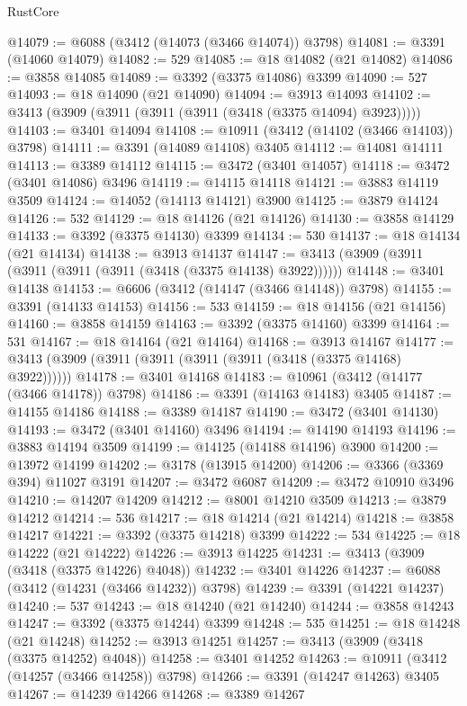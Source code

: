 \begin{lexlean}{RustCore}
\begin{coremodule}
@14079 := @6088 (@3412 (@14073 (@3466 @14074)) @3798)
@14081 := @3391 (@14060 @14079)
@14082 := 529
@14085 := @18 @14082 (@21 @14082)
@14086 := @3858 @14085
@14089 := @3392 (@3375 @14086) @3399
@14090 := 527
@14093 := @18 @14090 (@21 @14090)
@14094 := @3913 @14093
@14102 := @3413 (@3909 (@3911 (@3911 (@3911 (@3418 (@3375 @14094) @3923)))))
@14103 := @3401 @14094
@14108 := @10911 (@3412 (@14102 (@3466 @14103)) @3798)
@14111 := @3391 (@14089 @14108) @3405
@14112 := @14081 @14111
@14113 := @3389 @14112
@14115 := @3472 (@3401 @14057)
@14118 := @3472 (@3401 @14086) @3496
@14119 := @14115 @14118
@14121 := @3883 @14119 @3509
@14124 := @14052 (@14113 @14121) @3900
@14125 := @3879 @14124
@14126 := 532
@14129 := @18 @14126 (@21 @14126)
@14130 := @3858 @14129
@14133 := @3392 (@3375 @14130) @3399
@14134 := 530
@14137 := @18 @14134 (@21 @14134)
@14138 := @3913 @14137
@14147 := @3413 (@3909 (@3911 (@3911 (@3911 (@3911 (@3418 (@3375 @14138) @3922))))))
@14148 := @3401 @14138
@14153 := @6606 (@3412 (@14147 (@3466 @14148)) @3798)
@14155 := @3391 (@14133 @14153)
@14156 := 533
@14159 := @18 @14156 (@21 @14156)
@14160 := @3858 @14159
@14163 := @3392 (@3375 @14160) @3399
@14164 := 531
@14167 := @18 @14164 (@21 @14164)
@14168 := @3913 @14167
@14177 := @3413 (@3909 (@3911 (@3911 (@3911 (@3911 (@3418 (@3375 @14168) @3922))))))
@14178 := @3401 @14168
@14183 := @10961 (@3412 (@14177 (@3466 @14178)) @3798)
@14186 := @3391 (@14163 @14183) @3405
@14187 := @14155 @14186
@14188 := @3389 @14187
@14190 := @3472 (@3401 @14130)
@14193 := @3472 (@3401 @14160) @3496
@14194 := @14190 @14193
@14196 := @3883 @14194 @3509
@14199 := @14125 (@14188 @14196) @3900
@14200 := @13972 @14199
@14202 := @3178 (@13915 @14200)
@14206 := @3366 (@3369 @394) @11027 @3191
@14207 := @3472 @6087
@14209 := @3472 @10910 @3496
@14210 := @14207 @14209
@14212 := @8001 @14210 @3509
@14213 := @3879 @14212
@14214 := 536
@14217 := @18 @14214 (@21 @14214)
@14218 := @3858 @14217
@14221 := @3392 (@3375 @14218) @3399
@14222 := 534
@14225 := @18 @14222 (@21 @14222)
@14226 := @3913 @14225
@14231 := @3413 (@3909 (@3418 (@3375 @14226) @4048))
@14232 := @3401 @14226
@14237 := @6088 (@3412 (@14231 (@3466 @14232)) @3798)
@14239 := @3391 (@14221 @14237)
@14240 := 537
@14243 := @18 @14240 (@21 @14240)
@14244 := @3858 @14243
@14247 := @3392 (@3375 @14244) @3399
@14248 := 535
@14251 := @18 @14248 (@21 @14248)
@14252 := @3913 @14251
@14257 := @3413 (@3909 (@3418 (@3375 @14252) @4048))
@14258 := @3401 @14252
@14263 := @10911 (@3412 (@14257 (@3466 @14258)) @3798)
@14266 := @3391 (@14247 @14263) @3405
@14267 := @14239 @14266
@14268 := @3389 @14267

\end{coremodule}
\end{lexlean}

